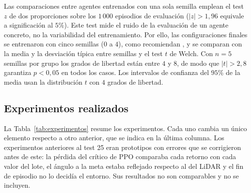 Las comparaciones entre agentes entrenados con una sola semilla emplean el
test $z$ de dos proporciones sobre los $1\,000$ episodios de evaluación
($|z| > 1{,}96$ equivale a significación al $5\%$). Este test mide el
ruido de la evaluación de un agente concreto, no la variabilidad del
entrenamiento. Por ello, las configuraciones finales se entrenaron con
cinco semillas ($0$ a $4$), como recomiendan \citet{agarwal2021deep}, y se
comparan con la media y la desviación típica entre semillas y el test
$t$ de Welch. Con $n = 5$ semillas por grupo los grados de libertad están
entre $4$ y $8$, de modo que $|t| > 2{,}8$ garantiza $p < 0{,}05$ en
todos los casos. Los intervalos de confianza del $95\%$ de la media
usan la distribución $t$ con $4$ grados de libertad.

\subsection{Experimentos realizados}
La Tabla~\ref{tab:experimentos} resume los experimentos. Cada uno cambia
un único elemento respecto a otro anterior, que se indica en la última
columna. Los experimentos anteriores al test 25 eran prototipos con
errores que se corrigieron antes de este: la pérdida del crítico de PPO
comparaba cada retorno con cada valor del lote, el ángulo a la meta
estaba reflejado respecto al del LiDAR y el fin de episodio no lo
decidía el entorno. Sus resultados no son comparables y no se incluyen.

